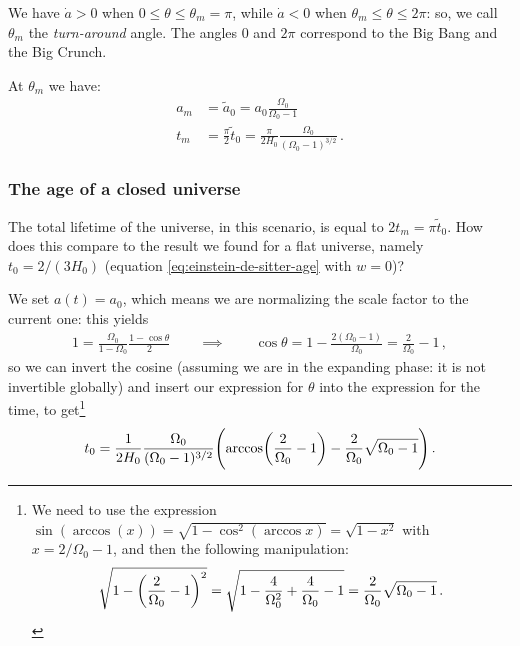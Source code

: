 \documentclass[main.tex]{subfiles}
\begin{document}
We have \(\dot{a} > 0 \)   when \(0 \leq \theta \leq \theta_m = \pi \), while \(\dot{a} < 0\) when \(\theta _m \leq \theta \leq 2 \pi \): so, we call \(\theta_{m}\) the \emph{turn-around} angle.
The angles \(0\) and \(2 \pi \) correspond to the Big Bang and the Big Crunch.

At \(\theta _m\) we have: 
%
\begin{align}
  a_m &= \widetilde{a}_{0} =  a_0 \frac{\Omega_0}{\Omega_0 -1}  \\
  t_m &= \frac{\pi}{2} \widetilde{t}_0 = \frac{\pi}{2 H_0 } \frac{\Omega_0}{(\Omega_0 -1)^{3/2}}
\,.
\end{align}

\subsubsection{The age of a closed universe}

The total lifetime of the universe, in this scenario, is equal to \(2 t_m = \pi \widetilde{t}_{0}\). How does this compare to the result we found for a flat universe, namely \(t_0 = 2 / (3 H_0 )\) (equation \eqref{eq:einstein-de-sitter-age} with \(w=0\))?

We set \(a(t) = a_0 \), which means we are normalizing the scale factor to the current one: this yields 
%
\begin{align}
1= \frac{\Omega_0}{1-\Omega_0 } \frac{1 - \cos \theta }{2}
\qquad \implies \qquad
\cos \theta = 1 - \frac{2 (\Omega_0 -1)}{\Omega_0 } = \frac{2}{\Omega_0 }-1
\,,
\end{align}
%
so we can invert the cosine (assuming we are in the expanding phase: it is not invertible globally) and insert our expression for \(\theta \) into the expression for the time, to get\footnote{We need to use the expression \(\sin(
\arccos(x)) = \sqrt{1- \cos^2(\arccos x)} = \sqrt{1- x^2}\) with \(x = 2/ \Omega_0 -1\), and then the following manipulation: 
%
\begin{align}
\sqrt{1 - \qty(\frac{2}{\Omega_0 }-1)^2} = \sqrt{1 - \frac{4}{\Omega_0^2} + \frac{4}{\Omega_0} -1}
= \frac{2}{\Omega_0 } \sqrt{\Omega_0 -1 }
\,.
\end{align}}
%
\begin{equation} \label{eq:positive-curvature-age}
  t_0 = \frac{1}{2H_0 } \frac{\Omega_0  }{(\Omega_0 -1)^{3/2}} \qty(\arccos (\frac{2}{\Omega_0 }-1) - \frac{2}{\Omega_0 } \sqrt{\Omega_0 -1 })
\,.
\end{equation}
\end{document}
